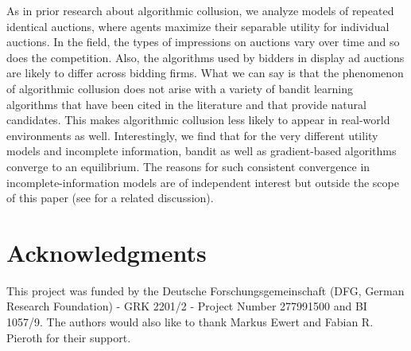 \documentclass{article}
\begin{document}
As in prior research about algorithmic collusion, we analyze models of repeated identical auctions, where agents maximize their separable utility for individual auctions. In the field, the types of impressions on auctions vary over time and so does the competition. Also, the algorithms used by bidders in display ad auctions are likely to differ across bidding firms. 
What we can say is that the phenomenon of algorithmic collusion does not arise with a variety of bandit learning algorithms that have been cited in the literature and that provide natural candidates. This makes algorithmic collusion less likely to appear in real-world environments as well. 
Interestingly, we find that for the very different utility models and incomplete information, bandit as well as gradient-based algorithms converge to an equilibrium. The reasons for such consistent convergence in incomplete-information models are of independent interest but outside the scope of this paper (see \citet{bichler2023soda} for a related discussion). 


\section*{Acknowledgments}
This project was funded by the Deutsche Forschungsgemeinschaft (DFG, German Research Foundation) - GRK 2201/2 - Project Number 277991500 and BI 1057/9. The authors would also like to thank Markus Ewert and Fabian R. Pieroth for their support.


 
%

\end{document}
